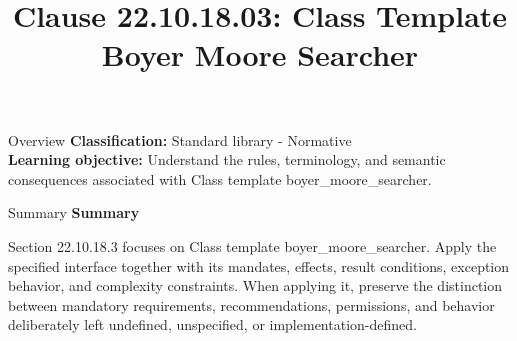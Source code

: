 \documentclass[10pt,letterpaper]{article}
\title{Clause 22.10.18.03: Class Template Boyer Moore Searcher}
\author{}
\date{}
\begin{document}
\maketitle
\begin{CornellOverviewBox}{Overview}
\textbf{Classification:} Standard library - Normative\\[2pt]
\textbf{Learning objective:} Understand the rules, terminology, and semantic consequences associated with Class template boyer\_moore\_searcher.
\end{CornellOverviewBox}\begin{CornellSummaryBox}{Summary}
{\sffamily\bfseries\color{Accent} Summary}\par\vspace{3pt}Section 22.10.18.3 focuses on Class template boyer\_moore\_searcher. Apply the specified interface together with its mandates, effects, result conditions, exception behavior, and complexity constraints. When applying it, preserve the distinction between mandatory requirements, recommendations, permissions, and behavior deliberately left undefined, unspecified, or implementation-defined.
\end{CornellSummaryBox}
\end{document}
